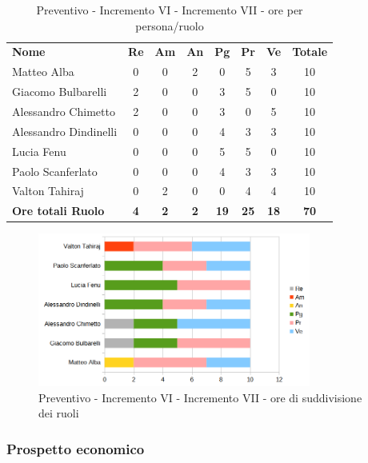 \begin{table} [h!]
	\begin{center}
		\begin{tabular} { m{3.5cm} c c c c c c c }
			\rowcolor{lightgray}
			\textbf{Nome} & \textbf{Re} & \textbf{Am} & \textbf{An} & \textbf{Pg} & \textbf{Pr} & \textbf{Ve} & \textbf{Totale} \\
			Matteo Alba &0 &0 & 2& 0 &5 & 3 & 10 \\
			Giacomo Bulbarelli & 2&0 & 0& 3 & 5 & 0 & 10 \\
			Alessandro Chimetto & 2 & 0& 0& 3 & 0 & 5& 10 \\
			Alessandro Dindinelli & 0& 0 & 0& 4 & 3 &3 & 10 \\
			Lucia Fenu & 0 & 0 &0 & 5 & 5 & 0 & 10 \\
			Paolo Scanferlato &0 & 0 &0 & 4 & 3 & 3 & 10\\
			Valton Tahiraj & 0& 2 &0 & 0 & 4 & 4 & 10 \\
			\textbf{Ore totali Ruolo} & \textbf{4} & \textbf{2} & \textbf{2} & \textbf{19} & \textbf{25}& \textbf{18} & \textbf{70}
		\end{tabular}
		\caption{Preventivo - Incremento VI - Incremento VII - ore per persona/ruolo}
	\end{center}
\end{table}
\begin{figure} [h!]
	\centering
	\includegraphics[width=0.8\textwidth]{res/img/preventivi/6e7-barre.png}
	\caption{Preventivo - Incremento VI - Incremento VII - ore di suddivisione dei ruoli} 
\end{figure}

\newpage
\subsubsection{Prospetto economico}


